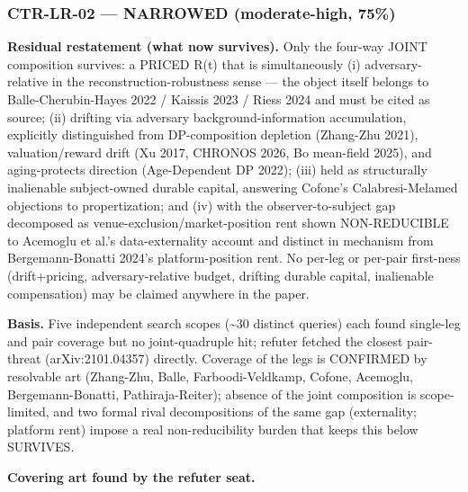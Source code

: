 \documentclass[
  11pt,
]{article}
\begin{document}
\subsubsection{CTR-LR-02 --- NARROWED (moderate-high,
75\%)}\label{ctr-lr-02-narrowed-moderate-high-75}

\textbf{Residual restatement (what now survives).} Only the four-way
JOINT composition survives: a PRICED R(t) that is simultaneously (i)
adversary-relative in the reconstruction-robustness sense --- the object
itself belongs to Balle-Cherubin-Hayes 2022 / Kaissis 2023 / Riess 2024
and must be cited as source; (ii) drifting via adversary
background-information accumulation, explicitly distinguished from
DP-composition depletion (Zhang-Zhu 2021), valuation/reward drift (Xu
2017, CHRONOS 2026, Bo mean-field 2025), and aging-protects direction
(Age-Dependent DP 2022); (iii) held as structurally inalienable
subject-owned durable capital, answering Cofone's Calabresi-Melamed
objections to propertization; and (iv) with the observer-to-subject gap
decomposed as venue-exclusion/market-position rent shown NON-REDUCIBLE
to Acemoglu et al.'s data-externality account and distinct in mechanism
from Bergemann-Bonatti 2024's platform-position rent. No per-leg or
per-pair first-ness (drift+pricing, adversary-relative budget, drifting
durable capital, inalienable compensation) may be claimed anywhere in
the paper.

\textbf{Basis.} Five independent search scopes (\textasciitilde30
distinct queries) each found single-leg and pair coverage but no
joint-quadruple hit; refuter fetched the closest pair-threat
(arXiv:2101.04357) directly. Coverage of the legs is CONFIRMED by
resolvable art (Zhang-Zhu, Balle, Farboodi-Veldkamp, Cofone, Acemoglu,
Bergemann-Bonatti, Pathiraja-Reiter); absence of the joint composition
is scope-limited, and two formal rival decompositions of the same gap
(externality; platform rent) impose a real non-reducibility burden that
keeps this below SURVIVES.

\textbf{Covering art found by the refuter seat.}
\end{document}
